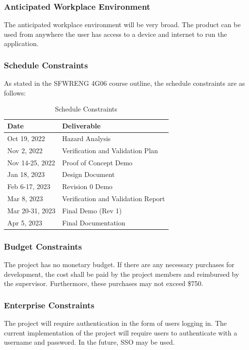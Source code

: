 \documentclass[12pt]{article}
\begin{document}
\subsubsection{Anticipated Workplace Environment}
The anticipated workplace environment will be very broad. The product can be used from anywhere the
user has access to a device and internet to run the application.

\subsubsection{Schedule Constraints}
As stated in the SFWRENG 4G06 course outline, the schedule constraints are as follows:
\begin{table}[H]
	\centering
	\caption{Schedule Constraints}
	\vspace{5pt}
	\begin{tabular}{|p{}|p{}|}
		\hline
		\textbf{Date}   & \textbf{Deliverable}               \\
		\hline
		Oct 19, 2022    & Hazard Analysis                    \\
		\hline
		Nov 2, 2022     & Verification and Validation Plan   \\
		\hline
		Nov 14-25, 2022 & Proof of Concept Demo              \\
		\hline
		Jan 18, 2023    & Design Document                    \\
		\hline
		Feb 6-17, 2023  & Revision 0 Demo                    \\
		\hline
		Mar 8, 2023     & Verification and Validation Report \\
		\hline
		Mar 20-31, 2023 & Final Demo (Rev 1)                 \\
		\hline
		Apr 5, 2023     & Final Documentation                \\
		\hline
	\end{tabular}
\end{table}

\subsubsection{Budget Constraints}
The project has no monetary budget. If there are any necessary purchases for development, the cost
shall be paid by the project members and reimbursed by the supervisor. Furthermore, these purchases
may not exceed \$750.

\subsubsection{Enterprise Constraints}
The project will require authentication in the form of users logging in. The current implementation
of the project will require users to authenticate with a username and password. In the future, SSO
may be used.
\end{document}
